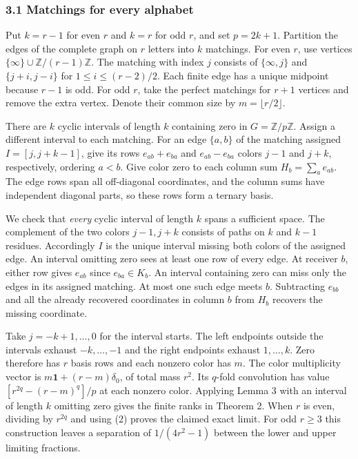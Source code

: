 \documentclass[
  10pt,
]{article}
\begin{document}
\subsubsection{3.1 Matchings for every
alphabet}\label{matchings-for-every-alphabet}

Put \(k=r-1\) for even \(r\) and \(k=r\) for odd \(r\), and set
\(p=2k+1\). Partition the edges of the complete graph on \(r\) letters
into \(k\) matchings. For even \(r\), use vertices
\(\{\infty\}\cup\mathbb Z/(r-1)\mathbb Z\). The matching with index
\(j\) consists of \(\{\infty,j\}\) and \(\{j+i,j-i\}\) for
\(1\le i\le(r-2)/2\). Each finite edge has a unique midpoint because
\(r-1\) is odd. For odd \(r\), take the perfect matchings for \(r+1\)
vertices and remove the extra vertex. Denote their common size by
\(m=\lfloor r/2\rfloor\).

There are \(k\) cyclic intervals of length \(k\) containing zero in
\(G=\mathbb Z/p\mathbb Z\). Assign a different interval to each
matching. For an edge \(\{a,b\}\) of the matching assigned
\(I=[j,j+k-1]\), give its rows \(e_{ab}+e_{ba}\) and \(e_{ab}-e_{ba}\)
colors \(j-1\) and \(j+k\), respectively, ordering \(a<b\). Give color
zero to each column sum \(H_b=\sum_a e_{ab}\). The edge rows span all
off-diagonal coordinates, and the column sums have independent diagonal
parts, so these rows form a ternary basis.

We check that \emph{every} cyclic interval of length \(k\) spans a
sufficient space. The complement of the two colors \(j-1,j+k\) consists
of paths on \(k\) and \(k-1\) residues. Accordingly \(I\) is the unique
interval missing both colors of the assigned edge. An interval omitting
zero sees at least one row of every edge. At receiver \(b\), either row
gives \(e_{ab}\) since \(e_{ba}\in K_b\). An interval containing zero
can miss only the edges in its assigned matching. At most one such edge
meets \(b\). Subtracting \(e_{bb}\) and all the already recovered
coordinates in column \(b\) from \(H_b\) recovers the missing
coordinate.

Take \(j=-k+1,\ldots,0\) for the interval starts. The left endpoints
outside the intervals exhaust \(-k,\ldots,-1\) and the right endpoints
exhaust \(1,\ldots,k\). Zero therefore has \(r\) basis rows and each
nonzero color has \(m\). The color multiplicity vector is
\(m\mathbf1+(r-m)\delta_0\), of total mass \(r^2\). Its \(q\)-fold
convolution has value \([r^{2q}-(r-m)^q]/p\) at each nonzero color.
Applying Lemma 3 with an interval of length \(k\) omitting zero gives
the finite ranks in Theorem 2. When \(r\) is even, dividing by
\(r^{2q}\) and using (2) proves the claimed exact limit. For odd
\(r\ge3\) this construction leaves a separation of \(1/(4r^2-1)\)
between the lower and upper limiting fractions.
\end{document}
